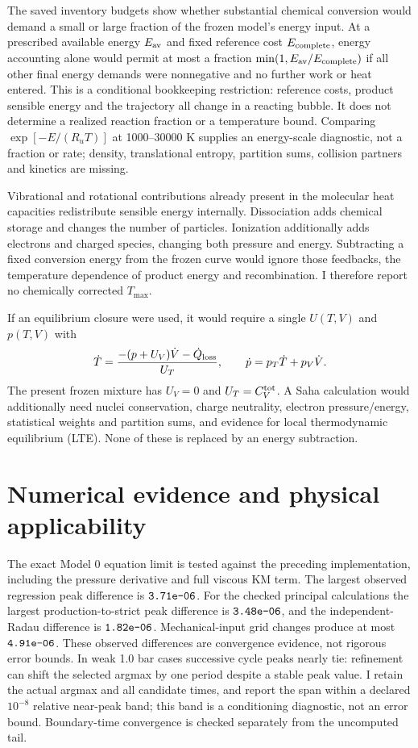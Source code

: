 \documentclass[10pt,a4paper]{article}
\newcommand{\sci}[1]{\ensuremath{\texttt{#1}}}
\begin{document}
The saved inventory budgets show whether substantial chemical conversion would demand a small or large fraction of the frozen model's energy input. At a prescribed available energy $E_{\rm av}$ and fixed reference cost $E_{\rm complete}$, energy accounting alone would permit at most a fraction $\min(1,E_{\rm av}/E_{\rm complete})$ if all other final energy demands were nonnegative and no further work or heat entered. This is a conditional bookkeeping restriction: reference costs, product sensible energy and the trajectory all change in a reacting bubble. It does not determine a realized reaction fraction or a temperature bound. Comparing $\exp[-E/(R_uT)]$ at 1000--30000 K supplies an energy-scale diagnostic, not a fraction or rate; density, translational entropy, partition sums, collision partners and kinetics are missing.

Vibrational and rotational contributions already present in the molecular heat capacities redistribute sensible energy internally. Dissociation adds chemical storage and changes the number of particles. Ionization additionally adds electrons and charged species, changing both pressure and energy. Subtracting a fixed conversion energy from the frozen curve would ignore those feedbacks, the temperature dependence of product energy and recombination. I therefore report no chemically corrected $T_{\max}$.

If an equilibrium closure were used, it would require a single $U(T,V)$ and $p(T,V)$ with
\[
\dot T=\frac{-(p+U_V)\dot V-\dot Q_{\rm loss}}{U_T},\qquad
\dot p=p_T\dot T+p_V\dot V.
\]
The present frozen mixture has $U_V=0$ and $U_T=C_V^{\rm tot}$. A Saha calculation would additionally need nuclei conservation, charge neutrality, electron pressure/energy, statistical weights and partition sums, and evidence for local thermodynamic equilibrium (LTE). None of these is replaced by an energy subtraction.

\newpage
\section{Numerical evidence and physical applicability}
The exact Model 0 equation limit is tested against the preceding implementation, including the pressure derivative and full viscous KM term. The largest observed regression peak difference is \sci{\MaximumRegression}. For the checked principal calculations the largest production-to-strict peak difference is \sci{\MaximumStrictDifference}, and the independent-Radau difference is \sci{\MaximumRadauDifference}. Mechanical-input grid changes produce at most \sci{\MaximumInputDifference}. These observed differences are convergence evidence, not rigorous error bounds. In weak 1.0 bar cases successive cycle peaks nearly tie: refinement can shift the selected argmax by one period despite a stable peak value. I retain the actual argmax and all candidate times, and report the span within a declared $10^{-8}$ relative near-peak band; this band is a conditioning diagnostic, not an error bound. Boundary-time convergence is checked separately from the uncomputed tail.
\end{document}

